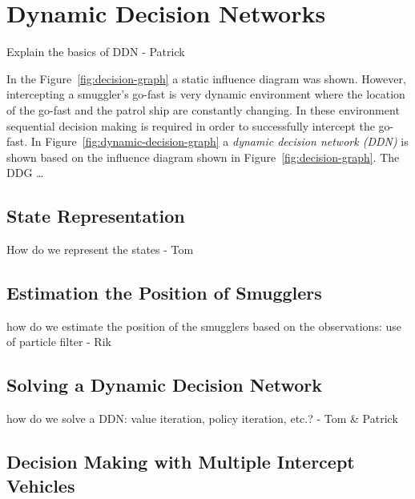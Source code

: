 \documentclass[conference]{IEEEtran}
\begin{document}
\section{Dynamic Decision Networks}



{\red Explain the basics of DDN - Patrick}

In the Figure~\ref{fig:decision-graph} a static influence diagram was shown. However, intercepting a smuggler's go-fast is very dynamic environment where the location of the go-fast and the patrol ship are constantly changing. In these environment sequential decision making is required in order to successfully intercept the go-fast. In Figure~\ref{fig:dynamic-decision-graph} a {\em dynamic decision network (DDN)} is shown based on the influence diagram shown in Figure~\ref{fig:decision-graph}. The DDG \ldots



\subsection{State Representation}

{\red How do we represent the states - Tom}


\subsection{Estimation the Position of Smugglers}


{\red how do we estimate the position of the smugglers based on the observations: use of particle filter - Rik}


\subsection{Solving a Dynamic Decision Network}


{\red how do we solve a DDN: value iteration, policy iteration, etc.? - Tom \& Patrick}



\subsection{Decision Making with Multiple Intercept Vehicles}
\end{document}

